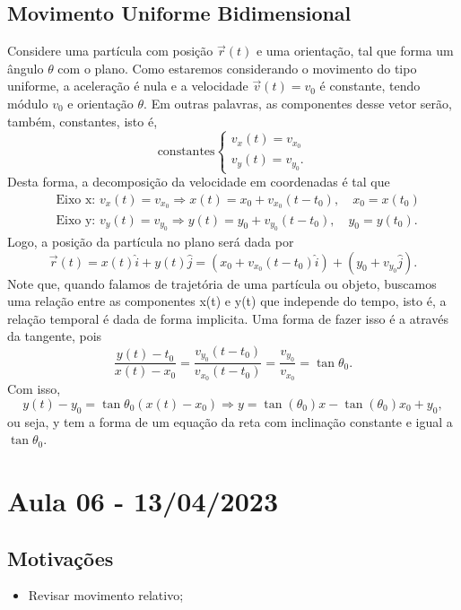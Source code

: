 \documentclass{article}
\begin{document}
\subsection{Movimento Uniforme Bidimensional}
    Considere uma part\'icula com posi\c c\~ao $\vec{r}(t)$ e uma orienta\c c\~ao, tal que forma um \^angulo $\theta$ com o plano. Como
  estaremos considerando o movimento do tipo uniforme, a acelera\c c\~ao \'e nula e a velocidade $\vec{v}(t) = v_{0}$ \'e constante,
  tendo m\'odulo $v_{0}$ e orienta\c c\~ao $\theta$. Em outras palavras, as componentes desse vetor ser\~ao, tamb\'em, constantes, isto \'e, 
    $$
    \text{constantes}\left\{\begin{array}{ll}
          v_{x}(t) = v_{x_{0}}\\
          v_{y}(t) = v_{y_{0}}.
        \end{array}\right.
    $$
    Desta forma, a decomposi\c c\~ao da velocidade em coordenadas \'e tal que 
   \begin{align*}
     &\text{Eixo x: }v_{x}(t) = v_{x_{0}} \Rightarrow x(t) = x_{0} + v_{x_{0}}(t-t_{0}),\quad x_{0} = x(t_{0})\\
     &\text{Eixo y: }v_{y}(t) = v_{y_{0}} \Rightarrow y(t) = y_{0} + v_{y_{0}}(t-t_{0}),\quad y_{0} = y(t_{0}).
   \end{align*}
   Logo, a posi\c c\~ao da part\'icula no plano ser\'a dada por 
     $$
     \vec{r}(t) = x(t)\hat{i} + y(t)\hat{j} = (x_{0} + v_{x_{0}}(t-t_{0})\hat{i}) + (y_{0} + v_{y_{0}}\hat{j}).
     $$
  Note que, quando falamos de trajet\'oria de uma part\'icula ou objeto, buscamos uma rela\c c\~ao entre as componentes x(t) e y(t) que
independe do tempo, isto \'e, a rela\c c\~ao temporal \'e dada de forma implicita. Uma forma de fazer isso \'e a atrav\'es da tangente, pois 
  $$
  \frac{y(t) - t_{0}}{x(t) - x_{0}} = \frac{v_{y_{0}}(t-t_{0})}{v_{x_{0}}(t-t_{0})} = \frac{v_{y_{0}}}{v_{x_{0}}} = \tan{\theta_{0}}.
  $$
  Com isso, 
    $$
    y(t) - y_{0} = \tan{\theta_{0}}(x(t)-x_{0}) \Rightarrow y = \tan{(\theta_{0})}x - \tan{(\theta_{0})}x_{0} + y_{0},
    $$
    ou seja, y tem a forma de um equa\c c\~ao da reta com inclina\c c\~ao constante e igual a $\tan{\theta_{0}}.$
\newpage

\section{Aula 06 - 13/04/2023}
\subsection{Motiva\c c\~oes}
\begin{itemize}
\item Revisar movimento relativo;
\end{itemize}
\end{document}
